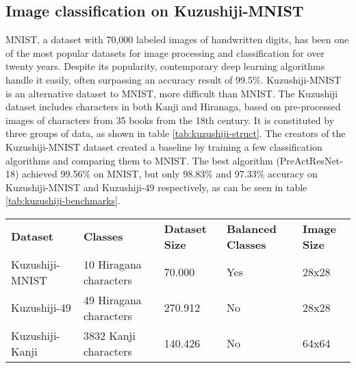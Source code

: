\subsection{Image classification on Kuzushiji-MNIST}
\label{ssec:imagemnist}

MNIST, a dataset with 70,000 labeled images of handwritten digits, has been one of the most popular datasets for image processing and classification for over twenty years. Despite its popularity, contemporary deep learning algorithms handle it easily, often surpassing an accuracy result of 99.5\%. Kuzushiji-MNIST \cite{Clanuwat2018-vm} is an alternative dataset to MNIST, more difficult than MNIST. The Kuzushiji dataset includes characters in both Kanji and Hiranaga, based on pre-processed images of characters from 35 books from the 18th century. It is constituted by three groups of data, as shown in table \ref{tab:kuzushiji-struct}. The creators of the Kuzushiji-MNIST dataset created a baseline by training a few classification algorithms and comparing them to MNIST. The best algorithm (PreActResNet-18) achieved 99.56\% on MNIST, but only 98.83\% and 97.33\% accuracy on Kuzushiji-MNIST and Kuzushiji-49 respectively, as can be seen in table \ref{tab:kuzushiji-benchmarks}.

\begin{table*}[h]
	\begin{tabular}{lllll}
		\rowcolor[HTML]{EFEFEF}
		\textbf{Dataset} & \textbf{Classes}       & \textbf{Dataset Size} & \textbf{Balanced Classes} & \textbf{Image Size} \\
		Kuzushiji-MNIST  & 10 Hiragana characters & 70.000                & Yes                       & 28x28               \\
		Kuzushiji-49     & 49 Hiragana characters & 270.912               & No                        & 28x28               \\
		Kuzushiji-Kanji  & 3832 Kanji characters  & 140.426               & No                        & 64x64
	\end{tabular}
	\caption{Description of the structure of the Kuzushiji-MNIST dataset from \cite{Clanuwat2018-vm}.}
	\label{tab:kuzushiji-struct}
\end{table*}

